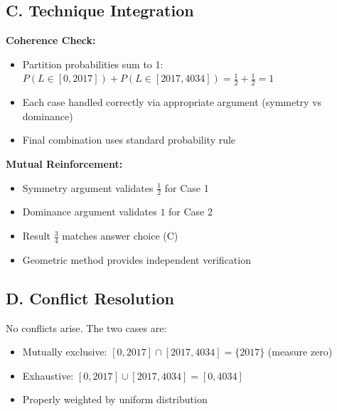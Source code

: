 \documentclass[]{article}
\begin{document}
\begin{techniquesbox}
\subsection*{C. Technique Integration}
\textbf{Coherence Check:}
\begin{itemize}[leftmargin=*]
    \item[$\checkmark$] Partition probabilities sum to 1: $P(L \in [0,2017]) + P(L \in [2017,4034]) = \frac{1}{2} + \frac{1}{2} = 1$
    \item[$\checkmark$] Each case handled correctly via appropriate argument (symmetry vs dominance)
    \item[$\checkmark$] Final combination uses standard probability rule
\end{itemize}

\textbf{Mutual Reinforcement:}
\begin{itemize}[leftmargin=*]
    \item Symmetry argument validates $\frac{1}{2}$ for Case 1
    \item Dominance argument validates $1$ for Case 2
    \item Result $\frac{3}{4}$ matches answer choice (C)
    \item Geometric method provides independent verification
\end{itemize}

\subsection*{D. Conflict Resolution}
No conflicts arise. The two cases are:
\begin{itemize}[leftmargin=*]
    \item Mutually exclusive: $[0,2017] \cap [2017,4034] = \{2017\}$ (measure zero)
    \item Exhaustive: $[0,2017] \cup [2017,4034] = [0,4034]$
    \item Properly weighted by uniform distribution
\end{itemize}
\end{techniquesbox}
\end{document}
